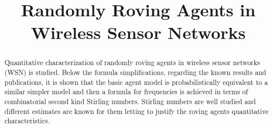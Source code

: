 \documentclass[conference]{IEEEtran}
\begin{document}
\title{Randomly Roving Agents in Wireless Sensor Networks}

\author{
\and
{}
}

\maketitle

\begin{abstract}
Quantitative characterization of randomly roving agents in wireless sensor networks (WSN) is studied. Below the formula simplifications, regarding the known results and publications, it is shown that the basic agent model is probabilistically equivalent to a similar simpler model and then a formula for frequencies is achieved in terms of combinatorial second kind Stirling numbers. Stirling numbers are well studied and different estimates are known for them letting to justify the roving agents quantitative characteristics.
\end{abstract}

\IEEEpeerreviewmaketitle
\end{document}
